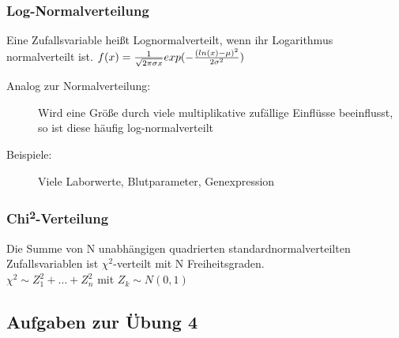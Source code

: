 \subsubsection{Log-Normalverteilung}
Eine Zufallsvariable heißt Lognormalverteilt, wenn ihr Logarithmus normalverteilt ist.
$ f(x) = { 1 \over \sqrt{2 \pi \sigma x} } exp(-{(ln(x) - \mu)^2 \over 2 \sigma^2}) $
\begin{description}
    \item[Analog zur Normalverteilung:] Wird eine Größe durch viele multiplikative zufällige Einflüsse beeinflusst, so ist diese häufig log-normalverteilt
    \item[Beispiele:] Viele Laborwerte, Blutparameter, Genexpression
\end{description}

\subsubsection{Chi\textsuperscript{2}-Verteilung}
Die Summe von N unabhängigen quadrierten standardnormalverteilten Zufallsvariablen ist $ \chi^2 $-verteilt mit N Freiheitsgraden. \\
$ \chi^2 \sim Z_1^2 + \dots + Z_n^2 $ mit $ Z_k \sim N(0,1) $

\subsection{Aufgaben zur Übung 4}
